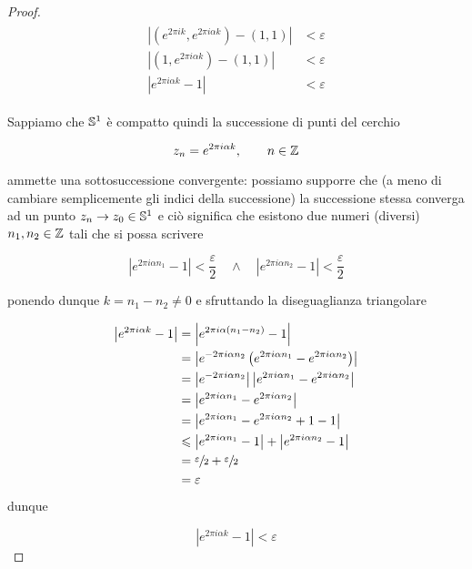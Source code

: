 \begin{proof}
	\begin{align}
		\begin{split}
			\left| (e^{2 \pi i k}, e^{2 \pi i \alpha k}) - (1,1) \right| &< \varepsilon\\
			\left| (1, e^{2 \pi i \alpha k}) - (1,1) \right| &< \varepsilon\\
			\left| e^{2 \pi i \alpha k} - 1 \right| &< \varepsilon
		\end{split}
	\end{align}

	Sappiamo che $ \S^{1} $ è compatto quindi la successione di punti del cerchio
	
	\begin{equation}
		z_{n} = e^{2 \pi i \alpha k}, \qquad n \in \Z
	\end{equation}

	ammette una sottosuccessione convergente: possiamo supporre che (a meno di cambiare semplicemente gli indici della successione) la successione stessa converga ad un punto $ z_{n} \to z_{0} \in \S^{1} $ e ciò significa che esistono due numeri (diversi) $ n_{1},n_{2} \in \Z $ tali che si possa scrivere
	
	\begin{equation}
		\left| e^{2 \pi i \alpha n_{1}} - 1 \right| < \dfrac{\varepsilon}{2} \quad \wedge \quad \left| e^{2 \pi i \alpha n_{2}} - 1 \right| < \dfrac{\varepsilon}{2}
	\end{equation}

	ponendo dunque $ k = n_{1} - n_{2} \neq 0 $ e sfruttando la diseguaglianza triangolare
	
	\begin{align}
		\begin{split}
			\left| e^{2 \pi i \alpha k} - 1 \right| &= \left| e^{2 \pi i \alpha (n_{1} - n_{2})} - 1 \right|\\
			&= \left| e^{ -2 \pi i \alpha n_{2}} \left( e^{2 \pi i \alpha n_{1}} - e^{2 \pi i \alpha n_{2}} \right) \right|\\
			&= \left| e^{ -2 \pi i \alpha n_{2}} \right| \left| e^{2 \pi i \alpha n_{1}} - e^{2 \pi i \alpha n_{2}} \right|\\
			&= \left| e^{2 \pi i \alpha n_{1}} - e^{2 \pi i \alpha n_{2}} \right|\\
			&= \left| e^{2 \pi i \alpha n_{1}} - e^{2 \pi i \alpha n_{2}} +1 -1 \right|\\
			&\leqslant \left| e^{2 \pi i \alpha n_{1}} - 1 \right| + \left| e^{2 \pi i \alpha n_{2}} - 1 \right|\\
			&= \sfrac{\varepsilon}{2} + \sfrac{\varepsilon}{2}\\
			&= \varepsilon
		\end{split}
	\end{align}

	dunque
	
	\begin{equation}
		\left| e^{2 \pi i \alpha k} - 1 \right| < \varepsilon
	\end{equation}
\end{proof}

